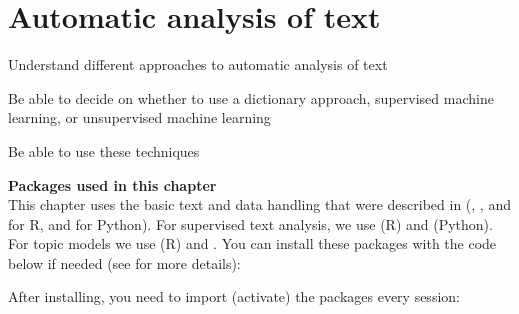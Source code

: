 \chapter{ Automatic analysis of text}
\label{chap:text}



\begin{abstract}{Abstract}
  In this chapter, we discuss different approaches to the automatic analysis of text; or automated content analysis. We combine techniques from earlier chapters, such as transforming texts into a matrix of term frequencies and machine learning. In particular, we describe three different approaches (dictionary-based analyses, supervised machine learning, unsupervised machine learning). The chapter provides guidance on how to conduct such analyses, and also on how to decide which of the approaches is most suitable for which types of questions.
\end{abstract}


\begin{objectives}
\item Understand different approaches to automatic analysis of text
\item Be able to decide on whether to use a dictionary approach, supervised machine learning, or unsupervised machine learning
\item Be able to use these techniques
\end{objectives}


\newpage
\begin{feature}
  \textbf{Packages used in this chapter}\\
  This chapter uses the basic text and data handling that were described in  (, , and  for R,  and for Python).
  For supervised text analysis, we use  (R) and  (Python).
  For topic models we use  (R) and .
  You can install these packages with the code below if needed  (see  for more details):


\noindent After installing, you need to import (activate) the packages every session:

\end{feature}














